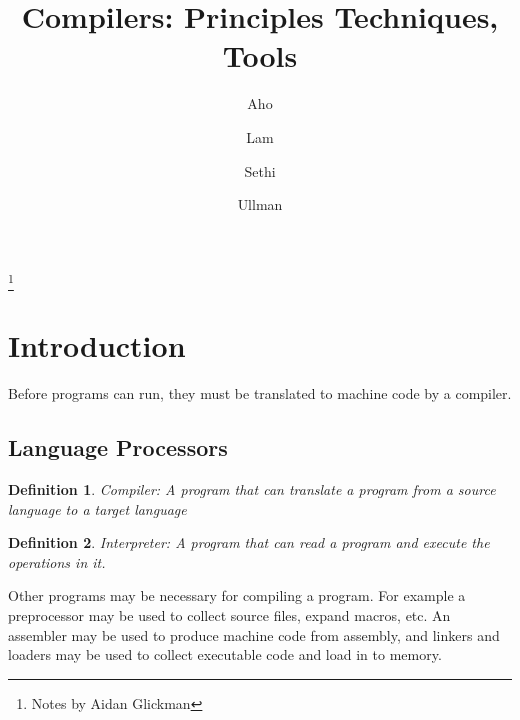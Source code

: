 \documentclass[titlepage]{article}
\newtheorem{definition}{Definition}
\begin{document}
\title{Compilers: Principles Techniques, Tools}
\author{Aho \and Lam \and Sethi \and Ullman}
\thanks{Notes by Aidan Glickman}
\maketitle
\tableofcontents

\section{Introduction}
Before programs can run, they must be translated to machine code by a compiler.

\subsection{Language Processors}
\begin{definition}
    \emph{Compiler}: A program that can translate a program from a source language to a target language
\end{definition}
\begin{definition}
    \emph{Interpreter}: A program that can read a program and execute the operations in it.
\end{definition}
Other programs may be necessary for compiling a program. For example a preprocessor may be used to collect source files, expand macros, etc. An assembler may be used to produce machine code from assembly, and linkers and loaders may be used to collect executable code and load in to memory.
\end{document}
